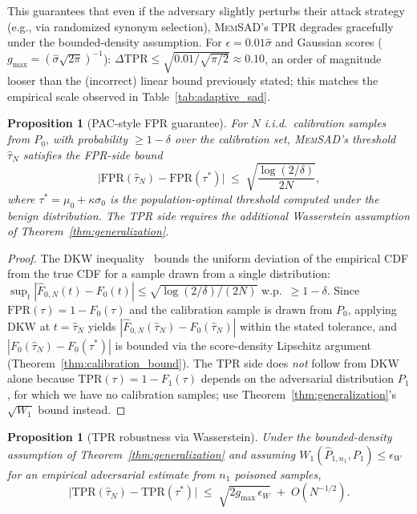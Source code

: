 \documentclass{article}
\newtheorem{proposition}[theorem]{Proposition}
\theoremstyle{definition}
\newcommand{\tpr}{\text{TPR}}
\newcommand{\fpr}{\text{FPR}}
\newcommand{\memsad}{\textnormal{\textsc{MemSAD}}}
\begin{document}
This guarantees that even if the adversary slightly perturbs their attack strategy (e.g., via randomized synonym selection), \memsad{}'s TPR degrades gracefully under the bounded-density assumption. For $\epsilon = 0.01\hat\sigma$ and Gaussian scores ($g_{\max} = (\hat\sigma\sqrt{2\pi})^{-1}$): $\Delta\tpr \leq \sqrt{0.01 / \sqrt{\pi/2}} \approx 0.10$, an order of magnitude looser than the (incorrect) linear bound previously stated; this matches the empirical scale observed in Table~\ref{tab:adaptive_sad}.

\begin{proposition}[PAC-style FPR guarantee]
\label{prop:pac}
For $N$ i.i.d.\ calibration samples from $P_0$, with probability $\geq 1 - \delta$ over the calibration set, \memsad{}'s threshold $\hat{\tau}_N$ satisfies the FPR-side bound
\begin{equation}
  \big|\fpr(\hat{\tau}_N) - \fpr(\tau^*)\big| \;\leq\; \sqrt{\frac{\log(2/\delta)}{2N}},
\end{equation}
where $\tau^* = \mu_0 + \kappa\sigma_0$ is the population-optimal threshold computed under the benign distribution. The TPR side requires the additional Wasserstein assumption of Theorem~\ref{thm:generalization}.
\end{proposition}

\begin{proof}
The DKW inequality~\citep{dvoretzky1956asymptotic,massart1990tight} bounds the uniform deviation of the empirical CDF from the true CDF for a sample drawn from a single distribution: $\sup_t |\widehat F_{0,N}(t) - F_0(t)| \leq \sqrt{\log(2/\delta)/(2N)}$ w.p.\ $\geq 1-\delta$. Since $\fpr(\tau) = 1 - F_0(\tau)$ and the calibration sample is drawn from $P_0$, applying DKW at $t = \hat\tau_N$ yields $|\widehat F_{0,N}(\hat\tau_N) - F_0(\hat\tau_N)|$ within the stated tolerance, and $|F_0(\hat\tau_N) - F_0(\tau^*)|$ is bounded via the score-density Lipschitz argument (Theorem~\ref{thm:calibration_bound}). The TPR side does \emph{not} follow from DKW alone because $\tpr(\tau) = 1 - F_1(\tau)$ depends on the adversarial distribution $P_1$, for which we have no calibration samples; use Theorem~\ref{thm:generalization}'s $\sqrt{W_1}$ bound instead.
\end{proof}

\begin{proposition}[TPR robustness via Wasserstein]
\label{prop:tpr_robust}
Under the bounded-density assumption of Theorem~\ref{thm:generalization} and assuming $W_1(\widehat P_{1,n_1}, P_1) \leq \epsilon_W$ for an empirical adversarial estimate from $n_1$ poisoned samples,
\[
  \big|\tpr(\hat\tau_N) - \tpr(\tau^*)\big| \;\leq\; \sqrt{2 g_{\max}\,\epsilon_W} \;+\; O(N^{-1/2}).
\]
\end{proposition}
\end{document}
